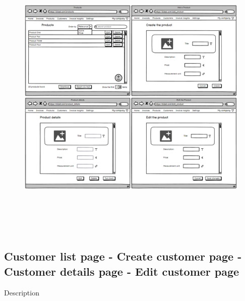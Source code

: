 \begin{figure}[h!]
    \centering
    \includegraphics[height=400pt, keepaspectratio]{resources/mockup/Product.png}
\end{figure}
\newpage
\subsection{Customer list page - Create customer page - Customer details page - Edit customer page}

Description

